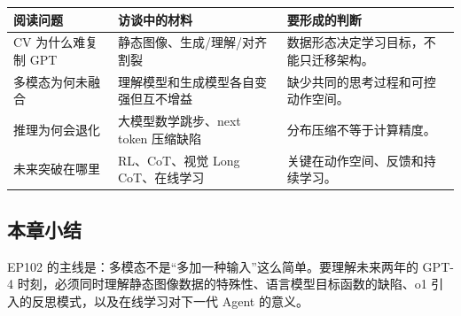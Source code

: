 \noindent\begin{tabularx}{\textwidth}{p{}p{}X}
\toprule
阅读问题 & 访谈中的材料 & 要形成的判断 \\
\midrule
CV 为什么难复制 GPT & 静态图像、生成/理解/对齐割裂 & 数据形态决定学习目标，不能只迁移架构。 \\
多模态为何未融合 & 理解模型和生成模型各自变强但互不增益 & 缺少共同的思考过程和可控动作空间。 \\
推理为何会退化 & 大模型数学跳步、next token 压缩缺陷 & 分布压缩不等于计算精度。 \\
未来突破在哪里 & RL、CoT、视觉 Long CoT、在线学习 & 关键在动作空间、反馈和持续学习。 \\
\bottomrule
\end{tabularx}

\subsection{本章小结}

EP102 的主线是：多模态不是“多加一种输入”这么简单。要理解未来两年的 GPT-4 时刻，必须同时理解静态图像数据的特殊性、语言模型目标函数的缺陷、o1 引入的反思模式，以及在线学习对下一代 Agent 的意义。

